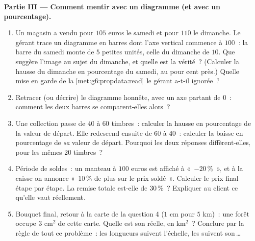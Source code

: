 \begin{problem}
\medskip
\noindent\textbf{Partie III --- Comment mentir avec un diagramme (et
avec un pourcentage).}
\begin{enumerate}[resume]
  \item Un magasin a vendu pour $105$ euros le samedi et pour $110$
        le dimanche. Le gérant trace un diagramme en barres dont
        l'axe vertical commence à $100$~: la barre du samedi monte
        de $5$ petites unités, celle du dimanche de $10$. Que
        suggère l'image au sujet du dimanche, et quelle est la
        vérité~? (Calculer la hausse du dimanche en pourcentage du
        samedi, au pour cent près.) Quelle mise en garde de la
        \cref{met:g6:propdata:read} le gérant a-t-il ignorée~?
  \item Retracer (ou décrire) le diagramme honnête, avec un axe
        partant de $0$~: comment les deux barres se comparent-elles
        alors~?
  \item Une collection passe de $40$ à $60$ timbres~: calculer la
        hausse en pourcentage de la valeur de départ. Elle
        redescend ensuite de $60$ à $40$~: calculer la baisse en
        pourcentage de \emph{sa} valeur de départ. Pourquoi les
        deux réponses diffèrent-elles, pour les mêmes $20$ timbres~?
  \item Période de soldes~: un manteau à $100$ euros est affiché à
        «~$-20\,\%$~», et à la caisse on annonce «~$10\,\%$ de plus
        sur le prix soldé~». Calculer le prix final étape par
        étape. La remise totale est-elle de $30\,\%$~? Expliquer au
        client ce qu'elle vaut réellement.
  \item Bouquet final, retour à la carte de la question 4 ($1$ cm
        pour $5$ km)~: une forêt occupe $3$ cm$^2$ de cette carte.
        Quelle est son  réelle, en km$^2$~? Conclure par la
        règle de tout ce problème~: les longueurs suivent
        l'échelle, les  suivent son\,\dots
\end{enumerate}
\end{problem}
